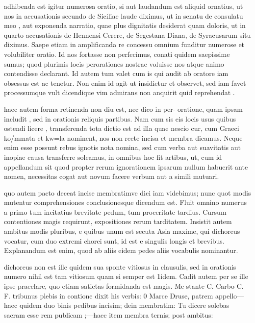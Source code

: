  adhibenda est igitur numerosa oratio, si aut laudandum est aliquid ornatius, ut nos in accusationis secundo de Siciliae laude diximus, ut in senatu de consulatu meo , aut exponenda narratio, quae plus dignitatis desiderat quam doloris, ut in quarto accusationis de Hennensi Cerere, de Segestana Diana, de Syracusarum situ diximus. Saepe etiam in amplificanda re concessu omnium funditur numerose et volubiliter oratio. Id nos fortasse non perfecimus, conati quidem saepissime sumus; quod plurimis locis perorationes nostrae voluisse nos atque animo contendisse declarant. Id autem tum valet cum is qui audit ab oratore iam obsessus est ac tenetur. Non enim id agit ut insidietur et observet, sed iam favet processumque vult dicendique vim admirans non anquirit quid reprehendat .

 haec autem forma retinenda non diu est, nec dico in per- oratione, quam ipsam includit , sed in orationis reliquis partibus. Nam cum sis eis locis usus quibus ostendi licere , transferenda tota dictio est ad illa quae nescio cur, cum Graeci ko/mmata et kw=la nominent, nos non recte incisa et membra dicamus. Neque enim esse possunt rebus ignotis nota nomina, sed cum verba aut suavitatis aut inopiae causa transferre soleamus, in omnibus hoc fit artibus, ut, cum id appellandum sit quod propter rerum ignorationem ipsarum nullum habuerit ante nomen, necessitas cogat aut novum facere verbum aut a simili mutuari.

 quo autem pacto deceat incise membratimve dici iam videbimus; nunc quot modis mutentur comprehensiones conclusionesque dicendum est. Fluit omnino numerus a primo tum incitatius brevitate pedum, tum proceritate tardius. Cursum contentiones magis requirunt, expositiones rerum tarditatem. Insistit autem ambitus modis pluribus, e quibus unum est secuta Asia maxime, qui dichoreus vocatur, cum duo extremi chorei sunt, id est e singulis longis et brevibus. Explanandum est enim, quod ab aliis eidem pedes aliis vocabulis nominantur.

 dichoreus non est ille quidem sua sponte vitiosus in clausulis, sed in orationis numero nihil est tam vitiosum quam si semper est 1idem. Cadit autem per se ille ipse praeclare, quo etiam satietas formidanda est magis. Me stante C. Carbo C. F. tribunus plebis in contione dixit his verbis: 0 Marce Druse, patrem appello—haec quidem duo binis pedibus incisim; dein membratim: Tu dicere solebas sacram esse rem publicam ;—haec item membra ternis; post ambitus:

